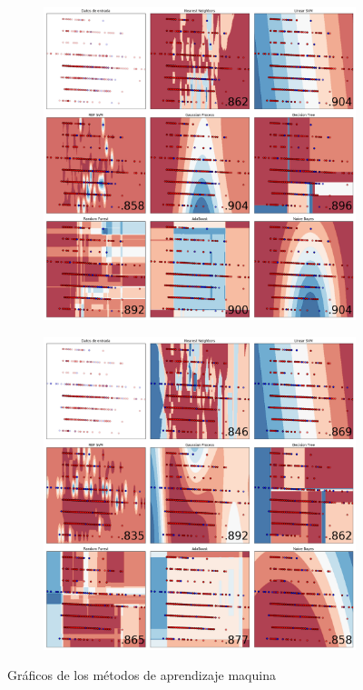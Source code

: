 \documentclass[5p,times]{elsarticle}
\begin{document}
\begin{figure}[H]
\begin{subfigure}[t]{0.3\textwidth}
\includegraphics[width=\textwidth]{12}
\caption{}
\end{subfigure}

\begin{subfigure}[t]{0.3\textwidth}
\includegraphics[width=\textwidth]{13}
\caption{}
\end{subfigure}
\caption{Gráficos de los métodos de aprendizaje maquina}\label{fig:MachineLearningGA}
\end{figure}
\end{document}
